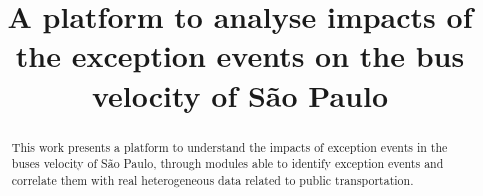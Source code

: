 \documentclass[runningheads]{llncs}
\begin{document}
%
\title{A platform to analyse impacts of the exception events on the bus velocity of São Paulo}
%
%

%
%
%
\maketitle              %
%
\begin{abstract}

This work presents a platform to understand the impacts of exception events in the buses velocity of São Paulo, through modules able to identify exception events and correlate them with real heterogeneous data related to public transportation.


\end{abstract}
%
%
%
%
%
\end{document}
